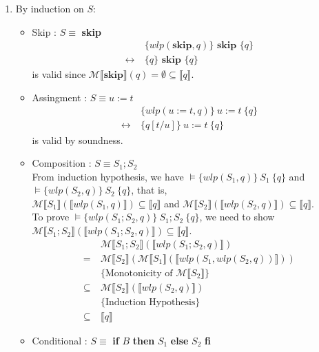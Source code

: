 \documentclass[11pt]{article}
\begin{document}
\begin{enumerate}
\begin{enumerate}
			\item By induction on $S$:
			\begin{itemize}
				\item Skip : $S\equiv$ \textbf{skip}
					\begin{align*}
						&\{wlp(\textbf{skip}, q)\}\textbf{ skip }\{q\}\\
						\leftrightarrow~ & \{q\}\textbf{ skip }\{q\}
					\end{align*}
					is valid since $\mathcal{M}\llbracket\textbf{skip}\rrbracket(q) = \emptyset \subseteq \llbracket q\rrbracket$.
				\item Assingment : $S\equiv u:=t$
					\begin{align*}
						&\{wlp(u:=t, q)\}~u:=t~\{q\}\\
						\leftrightarrow~ & \{q[t/u]\}~u:=t~\{q\}
					\end{align*}
					is valid by soundness.
				\item Composition : $S\equiv S_{1};S_{2}$\\
					From induction hypothesis, we have $\models \{wlp(S_{1}, q)\}~S_{1}~\{q\}$ and $\models \{wlp(S_{2}, q)\}~S_{2}~\{q\}$, that is,\\ $\mathcal{M}\llbracket S_{1} \rrbracket (\llbracket wlp(S_{1}, q) \rrbracket) \subseteq \llbracket q \rrbracket$ and $\mathcal{M}\llbracket S_{2} \rrbracket (\llbracket wlp(S_{2}, q) \rrbracket) \subseteq \llbracket q \rrbracket$.\\ To prove $\models \{wlp(S_{1};S_{2},q)\}~S_{1};S_{2}~\{q\}$, we need to show $\mathcal{M}\llbracket S_{1};S_{2}\rrbracket(\llbracket wlp(S_{1};S_{2}, q)\rrbracket) \subseteq \llbracket q \rrbracket$.
					\begin{align*}
						&\mathcal{M}\llbracket S_{1};S_{2}\rrbracket(\llbracket wlp(S_{1};S_{2}, q)\rrbracket)\\
						=~ & \mathcal{M}\llbracket S_{2}\rrbracket(\mathcal{M}\llbracket S_{1}\rrbracket(\llbracket wlp(S_{1}, wlp(S_{2}, q)) \rrbracket))\\
						&\{\text{Monotonicity of }\mathcal{M}\llbracket S_{2} \rrbracket\}\\
						\subseteq~ & \mathcal{M}\llbracket S_{2} \rrbracket(\llbracket wlp(S_{2}, q) \rrbracket)\\
						&\{\text{Induction Hypothesis}\}\\
						\subseteq~ & \llbracket q \rrbracket
					\end{align*}
				\item Conditional : $S\equiv$ \textbf{if} $B$ \textbf{then} $S_{1}$ \textbf{else} $S_{2}$ \textbf{fi}\\

\end{itemize}
\end{enumerate}
\end{enumerate}
\end{document}
